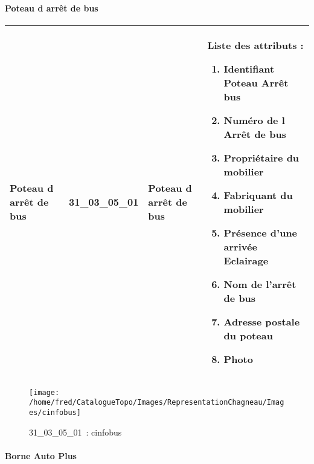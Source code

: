 \documentclass[12pt,titlepage]{book}
\begin{document}
\paragraph{Poteau d arrêt de bus}
\noindent
\vspace{\baselineskip}

\renewcommand{\arraystretch}{1.2}
\begin{supertabular}{|p{10cm}|c|p{13cm}|p{12cm}|}
 Poteau d arrêt de bus & 31\_03\_05\_01 & Poteau d arrêt de bus & Liste des attributs :
\begin{enumerate}
  \item Identifiant Poteau Arrêt bus  \item Numéro de l Arrêt de bus  \item Propriétaire du mobilier  \item Fabriquant du mobilier  \item Présence d'une arrivée Eclairage  \item Nom de l'arrêt de bus  \item Adresse postale du poteau  \item Photo\end{enumerate}
\\
\hline
\end{supertabular}
\begin{figure}[h!]
  \hfill         %
  \begin{minipage}[t]{3cm}
    \begin{center}
      \texttt{[image: /home/fred/CatalogueTopo/Images/RepresentationChagneau/Images/cinfobus]}
      \caption[~31\_03\_05\_01]{\small{31\_03\_05\_01~:} \tiny{cinfobus}}\label{cinfobus}
    \end{center}
  \end{minipage}
\end{figure}


\paragraph{Borne Auto Plus}
\noindent
\vspace{\baselineskip}
\end{document}
